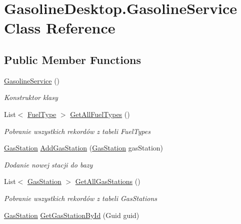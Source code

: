 \hypertarget{class_gasoline_desktop_1_1_gasoline_service}{}\section{Gasoline\+Desktop.\+Gasoline\+Service Class Reference}
\label{class_gasoline_desktop_1_1_gasoline_service}
\subsection*{Public Member Functions}
\begin{DoxyCompactItemize}
\item 
\mbox{\hyperlink{class_gasoline_desktop_1_1_gasoline_service_a86ac56afab474bdc68c4682f1bb50a32}{Gasoline\+Service}} ()
\begin{DoxyCompactList}\small\item\em Konstruktor klasy \end{DoxyCompactList}\item 
List$<$ \mbox{\hyperlink{class_gasoline_desktop_1_1_fuel_type}{Fuel\+Type}} $>$ \mbox{\hyperlink{class_gasoline_desktop_1_1_gasoline_service_af0f2d5757051b9680eccc8c2a592aaf2}{Get\+All\+Fuel\+Types}} ()
\begin{DoxyCompactList}\small\item\em Pobranie wszystkich rekordów z tabeli Fuel\+Types \end{DoxyCompactList}\item 
\mbox{\hyperlink{class_gasoline_desktop_1_1_gas_station}{Gas\+Station}} \mbox{\hyperlink{class_gasoline_desktop_1_1_gasoline_service_a896898680fc2723a823401d8d1213c06}{Add\+Gas\+Station}} (\mbox{\hyperlink{class_gasoline_desktop_1_1_gas_station}{Gas\+Station}} gas\+Station)
\begin{DoxyCompactList}\small\item\em Dodanie nowej stacji do bazy \end{DoxyCompactList}\item 
List$<$ \mbox{\hyperlink{class_gasoline_desktop_1_1_gas_station}{Gas\+Station}} $>$ \mbox{\hyperlink{class_gasoline_desktop_1_1_gasoline_service_a646a98b8e8448ae95039893eeacb4607}{Get\+All\+Gas\+Stations}} ()
\begin{DoxyCompactList}\small\item\em Pobranie wszystkich rekordów z tabeli Gas\+Stations \end{DoxyCompactList}\item 
\mbox{\hyperlink{class_gasoline_desktop_1_1_gas_station}{Gas\+Station}} \mbox{\hyperlink{class_gasoline_desktop_1_1_gasoline_service_a31cda76e3c9ed7c52935c42808704669}{Get\+Gas\+Station\+By\+Id}} (Guid guid)

\end{DoxyCompactItemize}
